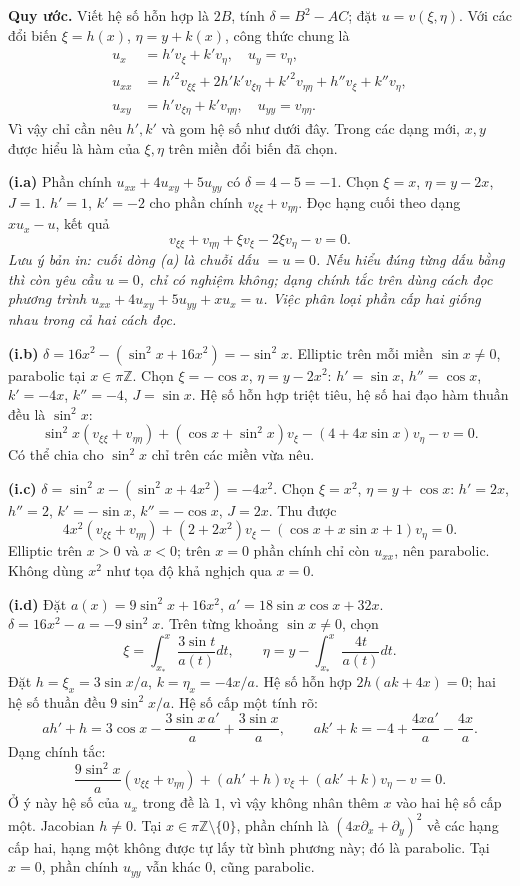 \textbf{Quy ước.} Viết hệ số hỗn hợp là $2B$, tính $\delta=B^2-AC$; đặt $u=v(\xi,\eta)$. Với các đổi biến $\xi=h(x)$, $\eta=y+k(x)$, công thức chung là
\begin{align*}
u_x&=h'v_\xi+k'v_\eta,\quad u_y=v_\eta,\\
u_{xx}&=h'^2v_{\xi\xi}+2h'k'v_{\xi\eta}+k'^2v_{\eta\eta}+h''v_\xi+k''v_\eta,\\
u_{xy}&=h'v_{\xi\eta}+k'v_{\eta\eta},\quad u_{yy}=v_{\eta\eta}.
\end{align*}
Vì vậy chỉ cần nêu $h',k'$ và gom hệ số như dưới đây. Trong các dạng mới, $x,y$ được hiểu là hàm của $\xi,\eta$ trên miền đổi biến đã chọn.

\textbf{(i.a)} Phần chính $u_{xx}+4u_{xy}+5u_{yy}$ có $\delta=4-5=-1$. Chọn $\xi=x$, $\eta=y-2x$, $J=1$. $h'=1$, $k'=-2$ cho phần chính $v_{\xi\xi}+v_{\eta\eta}$. Đọc hạng cuối theo dạng $xu_x-u$, kết quả
\[v_{\xi\xi}+v_{\eta\eta}+\xi v_\xi-2\xi v_\eta-v=0.\]
\textit{Lưu ý bản in: cuối dòng (a) là chuỗi dấu $=u=0$. Nếu hiểu đúng từng dấu bằng thì còn yêu cầu $u=0$, chỉ có nghiệm không; dạng chính tắc trên dùng cách đọc phương trình $u_{xx}+4u_{xy}+5u_{yy}+xu_x=u$. Việc phân loại phần cấp hai giống nhau trong cả hai cách đọc.}

\textbf{(i.b)} $\delta=16x^2-(\sin^2x+16x^2)=-\sin^2x$. Elliptic trên mỗi miền $\sin x\ne0$, parabolic tại $x\in\pi\mathbb Z$. Chọn $\xi=-\cos x$, $\eta=y-2x^2$: $h'=\sin x$, $h''=\cos x$, $k'=-4x$, $k''=-4$, $J=\sin x$. Hệ số hỗn hợp triệt tiêu, hệ số hai đạo hàm thuần đều là $\sin^2x$:
\[\sin^2x(v_{\xi\xi}+v_{\eta\eta})+(\cos x+\sin^2x)v_\xi-(4+4x\sin x)v_\eta-v=0.\]
Có thể chia cho $\sin^2x$ chỉ trên các miền vừa nêu.

\textbf{(i.c)} $\delta=\sin^2x-(\sin^2x+4x^2)=-4x^2$. Chọn $\xi=x^2$, $\eta=y+\cos x$: $h'=2x$, $h''=2$, $k'=-\sin x$, $k''=-\cos x$, $J=2x$. Thu được
\[4x^2(v_{\xi\xi}+v_{\eta\eta})+(2+2x^2)v_\xi-(\cos x+x\sin x+1)v_\eta=0.\]
Elliptic trên $x>0$ và $x<0$; trên $x=0$ phần chính chỉ còn $u_{xx}$, nên parabolic. Không dùng $x^2$ như tọa độ khả nghịch qua $x=0$.

\textbf{(i.d)} Đặt $a(x)=9\sin^2x+16x^2$, $a'=18\sin x\cos x+32x$. $\delta=16x^2-a=-9\sin^2x$. Trên từng khoảng $\sin x\ne0$, chọn
\[\xi=\int_{x_*}^x\frac{3\sin t}{a(t)}dt,\qquad
\eta=y-\int_{x_*}^x\frac{4t}{a(t)}dt.\]
Đặt $h=\xi_x=3\sin x/a$, $k=\eta_x=-4x/a$. Hệ số hỗn hợp $2h(ak+4x)=0$; hai hệ số thuần đều $9\sin^2x/a$. Hệ số cấp một tính rõ:
\[a h'+h=3\cos x-\frac{3\sin x\,a'}a+\frac{3\sin x}a,\qquad
ak'+k=-4+\frac{4xa'}a-\frac{4x}a.\]
Dạng chính tắc:
\[\frac{9\sin^2x}a(v_{\xi\xi}+v_{\eta\eta})+(ah'+h)v_\xi+(ak'+k)v_\eta-v=0.\]
Ở ý này hệ số của $u_x$ trong đề là $1$, vì vậy không nhân thêm $x$ vào hai hệ số cấp một.
Jacobian $h\ne0$. Tại $x\in\pi\mathbb Z\setminus\{0\}$, phần chính là $(4x\partial_x+\partial_y)^2$ về các hạng cấp hai, hạng một không được tự lấy từ bình phương này; đó là parabolic. Tại $x=0$, phần chính $u_{yy}$ vẫn khác $0$, cũng parabolic.

